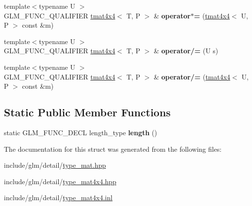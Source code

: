 \begin{DoxyCompactItemize}
\item 
\mbox{\label{structglm_1_1tmat4x4_a0054571806bb1caf0fdbc127fe406dc2}} 
{\footnotesize template$<$typename U $>$ }\\G\+L\+M\+\_\+\+F\+U\+N\+C\+\_\+\+Q\+U\+A\+L\+I\+F\+I\+ER \hyperlink{structglm_1_1tmat4x4}{tmat4x4}$<$ T, P $>$ \& {\bfseries operator$\ast$=} (\hyperlink{structglm_1_1tmat4x4}{tmat4x4}$<$ U, P $>$ const \&m)
\item 
\mbox{\label{structglm_1_1tmat4x4_ad7713e2bf039546e1799fe53f28d91ff}} 
{\footnotesize template$<$typename U $>$ }\\G\+L\+M\+\_\+\+F\+U\+N\+C\+\_\+\+Q\+U\+A\+L\+I\+F\+I\+ER \hyperlink{structglm_1_1tmat4x4}{tmat4x4}$<$ T, P $>$ \& {\bfseries operator/=} (U s)
\item 
\mbox{\label{structglm_1_1tmat4x4_abd9e65e0368e0cd8e977586f6a8706d4}} 
{\footnotesize template$<$typename U $>$ }\\G\+L\+M\+\_\+\+F\+U\+N\+C\+\_\+\+Q\+U\+A\+L\+I\+F\+I\+ER \hyperlink{structglm_1_1tmat4x4}{tmat4x4}$<$ T, P $>$ \& {\bfseries operator/=} (\hyperlink{structglm_1_1tmat4x4}{tmat4x4}$<$ U, P $>$ const \&m)
\end{DoxyCompactItemize}
\subsection*{Static Public Member Functions}
\begin{DoxyCompactItemize}
\item 
\mbox{\label{structglm_1_1tmat4x4_aaa9ea3c2a377939018c48646b3768311}} 
static G\+L\+M\+\_\+\+F\+U\+N\+C\+\_\+\+D\+E\+CL length\+\_\+type {\bfseries length} ()
\end{DoxyCompactItemize}


The documentation for this struct was generated from the following files\+:\begin{DoxyCompactItemize}
\item 
include/glm/detail/\hyperlink{type__mat_8hpp}{type\+\_\+mat.\+hpp}\item 
include/glm/detail/\hyperlink{type__mat4x4_8hpp}{type\+\_\+mat4x4.\+hpp}\item 
include/glm/detail/\hyperlink{type__mat4x4_8inl}{type\+\_\+mat4x4.\+inl}\end{DoxyCompactItemize}
